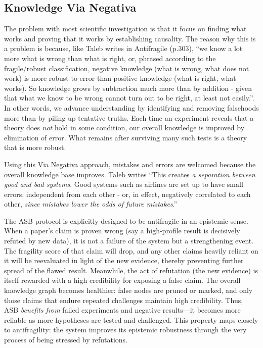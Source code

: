 \documentclass{article}
\begin{document}
\subsection{Knowledge Via Negativa}
The problem with most scientific investigation is that it focus on finding what works and proving that it works by establishing causality. The reason why this is a problem is because, like Taleb writes in Antifragile \cite{Taleb2012}(p.303), ``we know a lot more what is wrong than what is right, or, phrased according to the fragile/robust classification, negative knowledge (what is wrong, what does not work) is more robust to error than positive knowledge (what is right, what works). So knowledge grows by subtraction much more than by addition - given that what we know to be wrong cannot turn out to be right, at least not easily.''. In other words, we advance understanding by identifying and removing falsehoods more than by piling up tentative truths. Each time an experiment reveals that a theory does \emph{not} hold in some condition, our overall knowledge is improved by elimination of error. What remains after surviving many such tests is a theory that is more robust.

Using this Via Negativa approach, mistakes and errors are welcomed because the overall knowledge base improves. Taleb writes ``This creates \emph{a separation between good and bad systems}. Good systems such as airlines are set up to have small errors, independent from each other - or, in effect, negatively correlated to each other, \emph{since mistakes lower the odds of future mistakes}.''\cite{Taleb2012}

The ASB protocol is explicitly designed to be antifragile in an epistemic sense. When a paper's claim is proven wrong (say a high-profile result is decisively refuted by new data), it is not a failure of the system but a strengthening event. The fragility score of that claim will drop, and any other claims heavily reliant on it will be reevaluated in light of the new evidence, thereby preventing further spread of the flawed result. 
Meanwhile, the act of refutation (the new evidence) is itself rewarded with a high credibility for exposing a false claim. The overall knowledge graph becomes healthier: false nodes are pruned or marked, and only those claims that endure repeated challenges maintain high credibility. 
Thus, ASB \emph{benefits from} failed experiments and negative results---it becomes more reliable as more hypotheses are tested and challenged. This property maps closely to antifragility: the system improves its epistemic robustness through the very process of being stressed by refutations.
\end{document}
